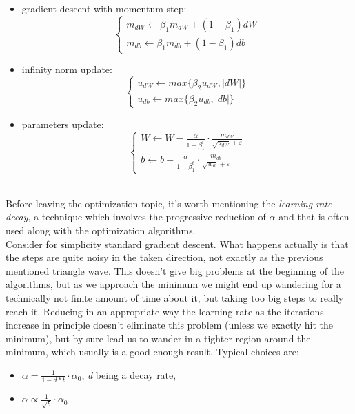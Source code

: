 \documentclass[12pt, a4paper]{report}
\theoremstyle{definition}
\begin{document}
\begin{itemize}\label{AdaMax}
	\item gradient descent with momentum step:
	\begin{equation*}
	\begin{cases}
	m_{dW}\longleftarrow\beta_1 m_{dW} + (1-\beta_1) dW\\
	m_{db}\longleftarrow\beta_1 m_{db} + (1-\beta_1) db
	\end{cases}
	\end{equation*}
	\item infinity norm update:
	\begin{equation*}
	\begin{cases}
	u_{dW}\longleftarrow max\{\beta_2 u_{dW}, |dW| \}\\
	u_{db}\longleftarrow max\{\beta_2 u_{db}, |db| \}
	\end{cases}
	\end{equation*}
	\item parameters update:
	\begin{equation*}
	\begin{cases}
	W\longleftarrow W - \frac{\alpha}{1-\beta_1^t}\cdot \frac{m_{dW}}{\sqrt{u_{dW}}+\varepsilon}\\
	b\longleftarrow b - \frac{\alpha}{1-\beta_1^t}\cdot \frac{m_{db}}{\sqrt{u_{db}}+\varepsilon}
	\end{cases}
	\end{equation*}
\end{itemize}
\noindent \\Before leaving the optimization topic, it's worth mentioning the \textit{learning rate decay}, a technique which involves the progressive reduction of $\alpha$ and that is often used along with the optimization algorithms.\\
Consider for simplicity standard gradient descent. What happens actually is that the steps are quite noisy in the taken direction, not exactly as the previous mentioned triangle wave. This doesn't give big problems at the beginning of the algorithms, but as we approach the minimum we might end up wandering for a technically not finite amount of time about it, but taking too big steps to really reach it. Reducing in an appropriate way the learning rate as the iterations increase in principle doesn't eliminate this problem (unless we exactly hit the minimum), but by sure lead us to wander in a tighter region around the minimum, which usually is a good enough result. Typical choices are:
\begin{itemize}
	\item $\alpha = \frac{1}{1-d*t}\cdot\alpha_0$, \textit{d} being a decay rate,
	\item $\alpha \propto \frac{1}{\sqrt{t}}\cdot\alpha_0$
\end{itemize}
\end{document}
